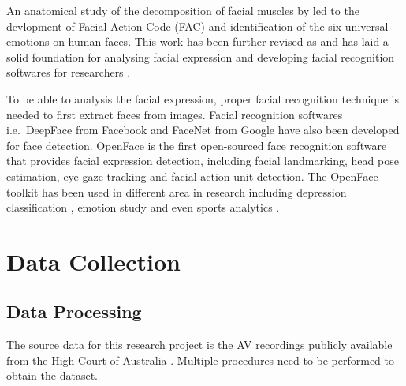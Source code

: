 \documentclass{monashthesis}
\begin{document}
An anatomical study of the decomposition of facial muscles by \autocite{ekman1976measuring} led to the devlopment of Facial Action Code (FAC) \autocite{ekman1978} and identification of the six universal emotions on human faces. This work has been further revised as \autocite{paulekmangroup} and has laid a solid foundation for analysing facial expression and developing facial recognition softwares for researchers \autocites{Kobayashi1992}{huang1997}{lien2000}{Kappoor2003}{Tong2007}{Cohn2009}{Lucey2010}.

To be able to analysis the facial expression, proper facial recognition technique is needed to first extract faces from images. Facial recognition softwares i.e.~DeepFace \autocite{taigman2014deepface} from Facebook and FaceNet \autocite{schroff2015facenet} from Google have also been developed for face detection. OpenFace \autocite{baltrusaitis2018openface} is the first open-sourced face recognition software that provides facial expression detection, including facial landmarking, head pose estimation, eye gaze tracking and facial action unit detection. The OpenFace toolkit has been used in different area in research including depression classification \autocites{yang2016decision}{nasir2016multimodal}, emotion study \autocites{Pan2018}{Nasir2016}{Huber2018} and even sports analytics \autocite{kovalchik2018going}.

\hypertarget{data-collection}{%
\chapter{Data Collection}\label{data-collection}}

\hypertarget{data-processing}{%
\section{Data Processing}\label{data-processing}}

The source data for this research project is the AV recordings publicly available from the High Court of Australia \autocite{highcourtau}. Multiple procedures need to be performed to obtain the dataset.
\end{document}
